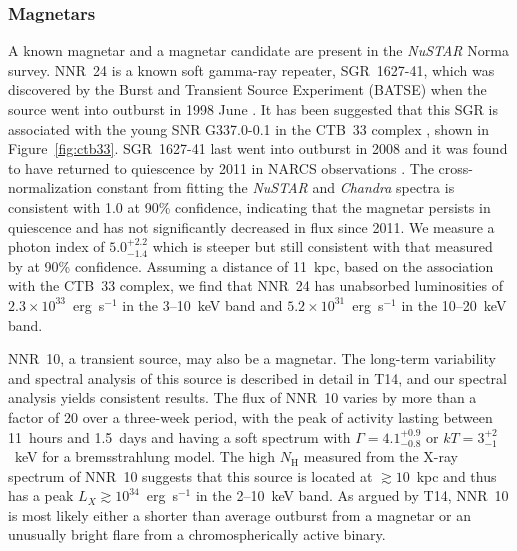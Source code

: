 \documentclass[iop,revtex4]{emulateapj}
\begin{document}
\subsubsection{Magnetars}
\label{sec:magnetar}
A known magnetar and a magnetar candidate are present in the \textit{NuSTAR} Norma survey.  NNR~24 is a known soft gamma-ray repeater, SGR~1627-41, which was discovered by the Burst and Transient Source Experiment (BATSE) when the source went into outburst in 1998 June \citep{woods99}.  It has been suggested that this SGR is associated with the young SNR G337.0-0.1 in the CTB~33 complex \citep{hurley99}, shown in Figure~\ref{fig:ctb33}.  SGR~1627-41 last went into outburst in 2008 \citep{esposito08} and it was found to have returned to quiescence by 2011 in NARCS observations \citep{an12}.  The cross-normalization constant from fitting the \textit{NuSTAR} and \textit{Chandra} spectra is consistent with 1.0 at 90\% confidence, indicating that the magnetar persists in quiescence and has not significantly decreased in flux since 2011.  We measure a photon index of $5.0^{+2.2}_{-1.4}$ which is steeper but still consistent with that measured by \citet{an12} at 90\% confidence.  Assuming a distance of 11~kpc, based on the association with the CTB~33 complex, we find that NNR~24 has unabsorbed luminosities of $2.3\times10^{33}$~erg~s$^{-1}$ in the 3--10~keV band and $5.2\times10^{31}$~erg~s$^{-1}$ in the 10--20~keV band. \par
NNR~10, a transient source, may also be a magnetar.  The long-term variability and spectral analysis of this source is described in detail in T14, and our spectral analysis yields consistent results.  The flux of NNR~10 varies by more than a factor of 20 over a three-week period, with the peak of activity lasting between 11~hours and 1.5~days and having a soft spectrum with $\Gamma=4.1^{+0.9}_{-0.8}$ or $kT=3^{+2}_{-1}$~keV for a bremsstrahlung model.  The high $N_{\mathrm{H}}$ measured from the X-ray spectrum of NNR~10 suggests that this source is located at $\gtrsim10$~kpc and thus has a peak $L_X\gtrsim10^{34}$~erg~s$^{-1}$ in the 2--10~keV band.  As argued by T14, NNR~10 is most likely either a shorter than average outburst from a magnetar or an unusually bright flare from a chromospherically active binary.  
\end{document}
